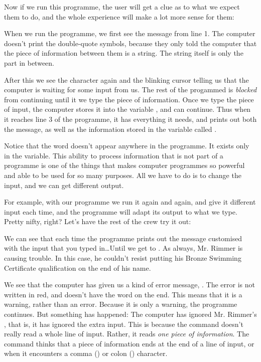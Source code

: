 \needspace{4cm}
Now if we run this programme, the user will get a clue as to what we
expect them to do, and the whole experience will make a lot more sense
for them:


When we run the programme, we first see the  message
from line 1.  The computer doesn't print the double-quote symbols,
because they only told the computer that the piece of information
between them is a string.  The string itself is only the part in
between.

After this we see the  character again and the blinking cursor
telling us that the computer is waiting for some input from us.  The
rest of the progammed is {\em blocked} from continuing until it we type the
piece of information.  Once we type the piece of input, the computer
stores it into the variable , and can continue.  Thus when it
reaches line 3 of the programme, it has everything it needs, and
prints out both the  message, as well as the information
stored in the variable called .

Notice that the word  doesn't appear anywhere in the
programme.  It exists only in the variable.  This ability to process
information that is not part of a programme is one of the things that
makes computer programmes so powerful and able to be used for so many
purposes. All we have to do is to change the input, and we can get
different output.


\needspace{4cm}
For example, with our programme we run it again and again, and give it
different input each time, and the
programme will adapt its output to what we type. Pretty nifty, right?
Let's have the rest of the crew try it out:


We can see that each time the programme prints out the message
customised with the input that you typed in\ldots Until we get to
. As always, Mr. Rimmer is causing trouble.  In this
case, he couldn't resist putting his Bronze Swimming Certificate
qualification on the end of his name.

We see that the computer has
given us a kind of error message, .
The error is not written in red, and doesn't have the word 
on the end.  This means that it is a warning, rather than an error.
Because it is only a warning, the programme continues.  But something
has happened: The computer has ignored Mr. Rimmer's , that
is, it has ignored the extra input.  This
is because the  command doesn't really read a whole line
of input. Rather, it reads {\em one piece of information}.  The
 command thinks that a piece of information ends at the end
of a line of input, or when it encounters a comma (\stw{,}) or colon
(\stw{:}) character.

